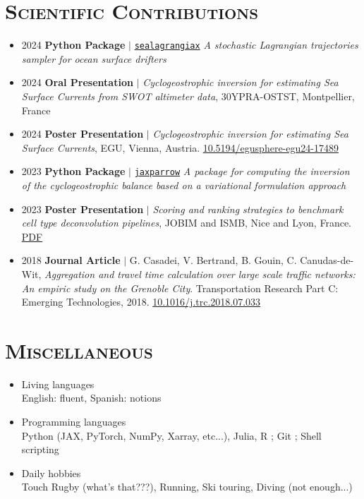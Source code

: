 \documentclass{article}
\begin{document}
\section*{\textsc{Scientific Contributions}}
\begin{itemize}
    \item[] 2024 \tabto{2cm} \textbf{Python Package} $\vert$ \href{https://gitfront.io/r/vadmbertr/9qHVDfXFk3pZ/sealagrangiax/}{\texttt{sealagrangiax}} \textit{A stochastic Lagrangian trajectories sampler for ocean surface drifters}
    
    \item[] 2024 \tabto{2cm} \textbf{Oral Presentation} $\vert$ \textit{Cyclogeostrophic inversion for estimating Sea Surface Currents from SWOT \tabto{2cm} altimeter data}, 30YPRA-OSTST, Montpellier, France
    
    \item[] 2024 \tabto{2cm} \textbf{Poster Presentation} $\vert$ \textit{Cyclogeostrophic inversion for estimating Sea Surface Currents}, EGU, Vienna, \tabto{2cm} Austria. \href{https://doi.org/10.5194/egusphere-egu24-17489}{10.5194/egusphere-egu24-17489}
    
    \item[] 2023 \tabto{2cm} \textbf{Python Package} $\vert$ \href{https://github.com/meom-group/jaxparrow}{\texttt{jaxparrow}} \textit{A package for computing the inversion of the cyclogeostrophic balance based \tabto{2cm} on a variational formulation approach}
    
    \item[] 2023 \tabto{2cm} \textbf{Poster Presentation} $\vert$ \textit{Scoring and ranking strategies to benchmark cell type deconvolution pipelines}, \tabto{2cm} JOBIM and ISMB, Nice and Lyon, France. \href{https://vadmbertr.github.io/Exploration-of-joint-deconvolution-algorithms-for-omic-data/poster_jobim_ismb.pdf}{PDF}
    
    \item[] 2018 \tabto{2cm} \textbf{Journal Article} $\vert$ G. Casadei, V. Bertrand, B. Gouin, C. Canudas-de-Wit, \textit{Aggregation and travel time \tabto{2cm} calculation over large scale traffic networks: An empiric study on the Grenoble City}. Transportation \tabto{2cm} Research Part C: Emerging Technologies, 2018. \href{https://doi.org/10.1016/j.trc.2018.07.033}{10.1016/j.trc.2018.07.033}
\end{itemize}

\section*{\textsc{Miscellaneous}}
\begin{itemize}
    \item[] Living languages \\[.1 cm] \tabto{2cm} English: fluent, Spanish: notions
    \item[] Programming languages \\[.1 cm] \tabto{2cm} Python (JAX, PyTorch, NumPy, Xarray, etc...), Julia, R ; Git ; Shell scripting
    \item[] Daily hobbies \\[.1 cm] \tabto{2cm} Touch Rugby (what's that???), Running, Ski touring, Diving (not enough...)
\end{itemize}
\end{document}
